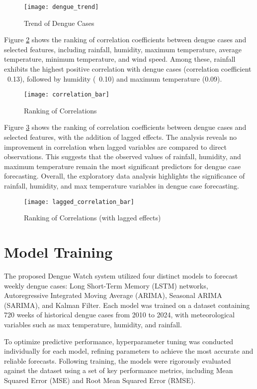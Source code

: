 \begin{figure}[ht]
	\centering
	\texttt{[image: dengue\_trend]}
	\caption{Trend of Dengue Cases}
	\label{fig:data_trend}
\end{figure}

Figure \ref{fig:correlation_bar} shows the ranking of correlation coefficients between dengue cases and selected features, including rainfall, humidity, maximum temperature, average temperature, minimum temperature, and wind speed. Among these, rainfall exhibits the highest positive correlation with dengue cases (correlation coefficient ~0.13), followed by humidity (~0.10) and maximum temperature (0.09). 

\begin{figure}[hbt!]
	\centering
	\texttt{[image: correlation\_bar]}
	\caption{Ranking of Correlations}
	\label{fig:correlation_bar}
\end{figure}

Figure \ref{fig:lagged_correlation_bar} shows the ranking of correlation coefficients between dengue cases and selected features, with the addition of lagged effects. The analysis reveals no improvement in correlation when lagged variables are compared to direct observations. This suggests that the observed values of rainfall, humidity, and maximum temperature remain the most significant predictors for dengue case forecasting. Overall, the exploratory data analysis highlights the significance of rainfall, humidity, and max temperature variables in dengue case forecasting.

\begin{figure}[hbt!]
	\centering
	\texttt{[image: lagged\_correlation\_bar]}
	\caption{Ranking of Correlations (with lagged effects)}
	\label{fig:lagged_correlation_bar}
\end{figure}


\section{Model Training}
The proposed Dengue Watch system utilized four distinct models to forecast weekly dengue cases: Long Short-Term Memory (LSTM) networks, Autoregressive Integrated Moving Average (ARIMA), Seasonal ARIMA (SARIMA), and Kalman Filter. Each model was trained on a dataset containing 720 weeks of historical dengue cases from 2010 to 2024, with meteorological variables such as max temperature, humidity, and rainfall.

To optimize predictive performance, hyperparameter tuning was conducted individually for each model, refining parameters to achieve the most accurate and reliable forecasts. Following training, the models were rigorously evaluated against the dataset using a set of key performance metrics, including Mean Squared Error (MSE) and Root Mean Squared Error (RMSE).

